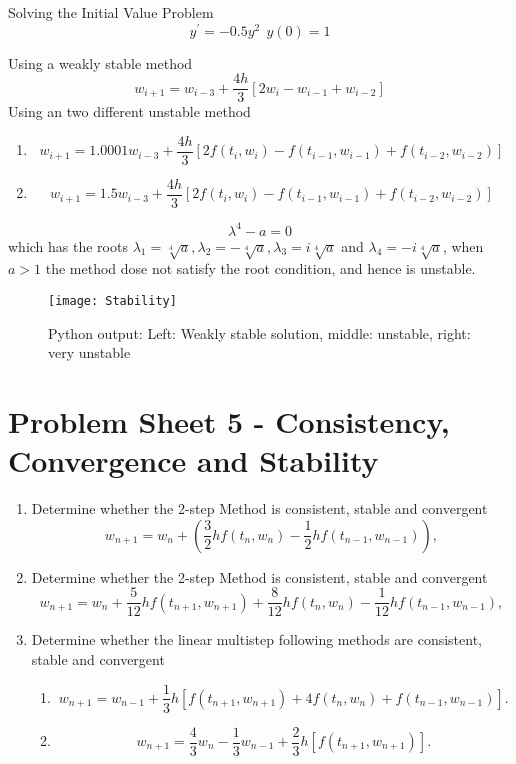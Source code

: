 \begin{example}
Solving the Initial Value Problem 
\[ y^{'}=-0.5y^{2} \ \ y(0)=1 \]

Using a weakly stable method
\[ w_{i+1}=w_{i-3}+\frac{4h}{3}[2w_{i}-w_{i-1}+w_{i-2}] \]
Using an two different unstable method
\begin{enumerate}
\item
\[ w_{i+1}=1.0001w_{i-3}+\frac{4h}{3}[2f(t_i,w_{i})-f(t_{i-1},w_{i-1})+f(t_{i-2},w_{i-2})] \]
\item
\[ w_{i+1}=1.5w_{i-3}+\frac{4h}{3}[2f(t_i,w_{i})-f(t_{i-1},w_{i-1})+f(t_{i-2},w_{i-2})] \]
\end{enumerate}
\[\lambda^4-a =0\]
which has the roots $\lambda_1=\sqrt[4]{a},\lambda_2=-\sqrt[4]{a},\lambda_3=i\sqrt[4]{a}$ and $\lambda_4=-i\sqrt[4]{a}$, when $a>1$ the method dose not satisfy the root condition, and hence is unstable.
\end{example}
\begin{figure}[H]
\centering
\texttt{[image: Stability]}
\caption{Python output: Left: Weakly stable solution, middle: unstable, right: very unstable }
\label{Stability}
\end{figure}


\newpage
\section{Problem Sheet 5 - Consistency, Convergence and Stability}
\begin{enumerate}
\item
Determine whether the 2-step  Method is consistent, stable and convergent 
\[ w_{n+1}=w_n+(\frac{3}{2}hf(t_{n},w_{n})-\frac{1}{2}hf(t_{n-1},w_{n-1})),\]

\item
Determine whether the 2-step  Method is consistent, stable and convergent 
\[ w_{n+1}=w_n+\frac{5}{12}hf(t_{n+1},w_{n+1})+\frac{8}{12}hf(t_{n},w_{n})-\frac{1}{12}hf(t_{n-1},w_{n-1}),\]

\item
Determine whether the linear multistep following methods are consistent, stable and convergent 
\begin{enumerate}
\item
\[w_{n+1}=w_{n-1}+\frac{1}{3}h[f(t_{n+1},w_{n+1})+4f(t_n,w_n)+f(t_{n-1},w_{n-1})].\]

\item

\[w_{n+1}=\frac{4}{3}w_{n}-\frac{1}{3}w_{n-1}+\frac{2}{3}h[f(t_{n+1},w_{n+1})]. \]

\end{enumerate}


\end{enumerate}
\newpage

